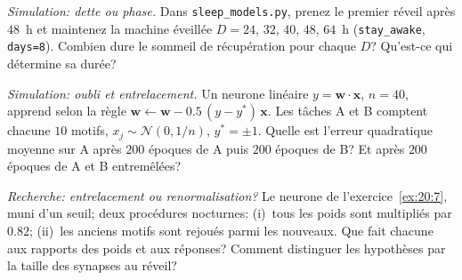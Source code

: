 \begin{exercise}[\lvlB]
\label{ex:20:6}
\emph{Simulation: dette ou phase.} Dans \texttt{sleep\_models.py}, prenez le premier réveil après $48$~h et maintenez la machine éveillée $D=24$, $32$, $40$, $48$, $64$~h (\texttt{stay\_awake}, \texttt{days=8}). Combien dure le sommeil de récupération pour chaque $D$? Qu'est-ce qui détermine sa durée?
\end{exercise}

\begin{exercise}[\lvlB]
\label{ex:20:7}
\emph{Simulation: oubli et entrelacement.} Un neurone linéaire $y=\mathbf w\cdot\mathbf x$, $n=40$, apprend selon la règle $\mathbf w\leftarrow\mathbf w-0.5\,(y-y^*)\,\mathbf x$. Les tâches A et B comptent chacune $10$ motifs, $x_j\sim\mathcal N(0,1/n)$, $y^*=\pm1$. Quelle est l'erreur quadratique moyenne sur A après $200$ époques de A puis $200$ époques de B? Et après $200$ époques de A et B entremêlées?
\end{exercise}

\begin{exercise}[\lvlC]
\label{ex:20:8}
\emph{Recherche: entrelacement ou renormalisation?} Le neurone de l'exercice~\ref{ex:20:7}, muni d'un seuil; deux procédures nocturnes: (i)~tous les poids sont multipliés par $0.82$; (ii)~les anciens motifs sont rejoués parmi les nouveaux. Que fait chacune aux rapports des poids et aux réponses? Comment distinguer les hypothèses par la taille des synapses au réveil?
\end{exercise}
